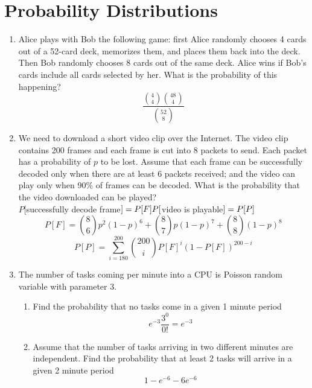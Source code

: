 \documentclass[10.5pt,letterpaper]{article}
\begin{document}
\section{Probability Distributions}
\begin{enumerate}[label=\textbf{Problem \arabic*.}] 
\item Alice plays with Bob the following game: first Alice randomly chooses 4 cards out of a 52-card deck, memorizes them, and places them back into the deck. Then Bob randomly chooses 8 cards out of the same deck. Alice wins if Bob's cards include all cards selected by her. What is the probability of this happening?
\[\frac{{{4}\choose{4}}{{48}\choose{4}}}{{{52}\choose{8}}}\]
\item We need to download a short video clip over the Internet. The video clip contains 200 frames and each frame is cut into 8 packets to send. Each packet has a probability of $p$ to be lost. Assume that each frame can be successfully decoded only when there are at least 6 packets received; and the video can play only when 90\% of frames can be decoded. What is the probability that the video downloaded can be played?\\
$P[$successfully decode frame$]=P[F]\\
P[$video is playable$]=P[P]\\$
\[P[F]={{8}\choose{6}}p^2(1-p)^6+{{8}\choose{7}}p(1-p)^7+{{8}\choose{8}}(1-p)^8\]
\[P[P]=\sum_{i=180}^{200}{{200}\choose{i}}P[F]^i(1-P[F])^{200-i}\]
\item The number of tasks coming per minute into a CPU is Poisson random variable with parameter 3.
	\begin{enumerate}[label=\alph*)]
	\item Find the probability that no tasks come in a given 1 minute period
	\[e^{-3}\frac{3^0}{0!}=e^{-3}\]
	\item Assume that the number of tasks arriving in two different minutes are independent. Find the probability that at least 2 tasks will arrive in a given 2 minute period
	\[1-e^{-6}-6e^{-6}\]
	\end{enumerate}
\end{enumerate}
\end{document}
